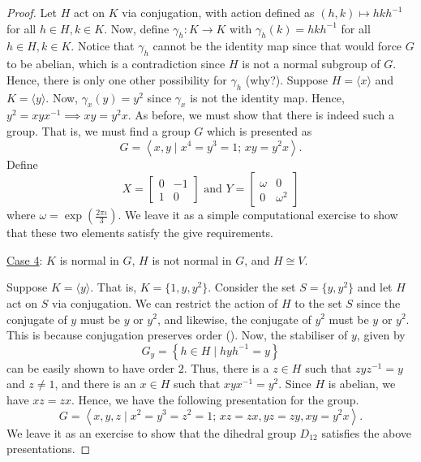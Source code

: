 \begin{proof}
    Let $H$ act on $K$ via conjugation, with action defined as $(h,k) \mapsto hkh^{-1}$ for all $h \in H, k \in K$. Now, define $\gamma_h \colon K \to K$ with $\gamma_h(k) = hkh^{-1}$ for all $h\in H, k \in K$. Notice that $\gamma_h$ cannot be the identity map since that would force $G$ to be abelian, which is a contradiction since $H$ is not a normal subgroup of $G$. Hence, there is only one other possibility for $\gamma_h$ (why?). Suppose $H = \langle x \rangle$ and $K = \langle y \rangle$. Now, $\gamma_x(y) = y^2$ since $\gamma_x$ is not the identity map. Hence, $y^2 = xyx^{-1} \implies xy = y^2x$. As before, we must show that there is indeed such a group. That is, we must find a group $G$ which is presented as
    \[
        G = \left\langle x,y \mid x^4 = y^3 = 1; \, xy = y^2x \right\rangle.
    \]
    Define 
    \[
        X = \begin{bmatrix}
            0 & -1 \\
            1 & 0
        \end{bmatrix} \text{ and } Y = \begin{bmatrix}
            \omega & 0 \\
            0 & \omega^2
        \end{bmatrix}
    \]
    where $\omega = \exp\left( \frac{2\pi\iota}{3} \right)$. We leave it as a simple computational exercise to show that these two elements satisfy the give requirements. 
    
    \underline{Case 4}: $K$ is normal in $G$, $H$ is not normal in $G$, and $H \cong V$. 
    
    Suppose $K = \langle y \rangle$. That is, $K = \{1,y,y^2\}$. Consider the set $S = \{y, y^2\}$ and let $H$ act on $S$ via conjugation. We can restrict the action of $H$ to the set $S$ since the conjugate of $y$ must be $y$ or $y^2$, and likewise, the conjugate of $y^2$ must be $y$ or $y^2$. This is because conjugation preserves order (). Now, the stabiliser of $y$, given by
    \[
        G_y = \left\{ h \in H \mid hyh^{-1} = y \right\}
    \]
    can be easily shown to have order $2$. Thus, there is a $z \in H$ such that $zyz^{-1} = y$ and $z \neq 1$, and there is an $x \in H$ such that $xyx^{-1} = y^2$. Since $H$ is abelian, we have $xz = zx$. Hence, we have the following presentation for the group.
    \[
        G = \left\langle x,y,z \mid x^2 = y^3 = z^2 = 1 ; \, xz = zx, yz = zy, xy = y^2x \right\rangle.
    \]
    We leave it as an exercise to show that the dihedral group $D_{12}$ satisfies the above presentations. 
\end{proof}

